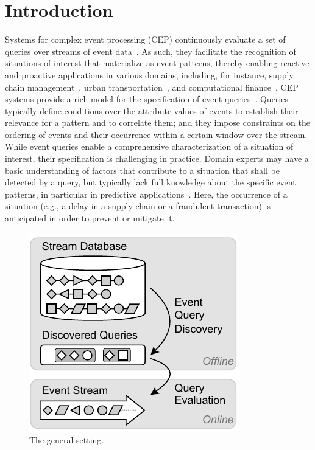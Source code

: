\section{Introduction}
\label{sec:introduction}
Systems for complex event processing (CEP) continuously evaluate a set of
queries over streams of event
data~\cite{DBLP:journals/csur/CugolaM12,DBLP:journals/vldb/GiatrakosAADG20}. As
such, they facilitate the recognition of situations of interest that
materialize as event patterns, thereby enabling reactive and proactive
applications in various domains, including, for instance,
supply chain management~\cite{DBLP:journals/cii/KonovalenkoL19}, urban
transportation~\cite{DBLP:conf/edbt/ArtikisWSBLPBMKMGMGK14}, and
computational finance~\cite{DBLP:journals/computer/ChandramouliAGSR10}.
CEP systems provide a rich model for the
specification of
event queries~\cite{DBLP:conf/debs/ArtikisMUVW17}. Queries typically define
conditions over the attribute values of events to establish their relevance
for a pattern and to correlate them; and they impose constraints on the
ordering of events and their occurrence within a certain window over the
stream.
While event queries enable a comprehensive characterization of a situation of
interest, their specification is challenging in practice. Domain experts may
have a basic understanding of factors that contribute to a
situation that shall be detected by a query, but typically lack full knowledge
about the specific event patterns, in particular in predictive
applications~\cite{DBLP:conf/debs/EngelEF12,DBLP:conf/debs/SejdovicHRS16}.
Here, the occurrence of a
situation (e.g., a delay in a supply chain or a
fraudulent
transaction) is anticipated in order to prevent or mitigate it.
\begin{figure}
	\centering
	\vspace{-1em}
	\includegraphics[width=0.5\columnwidth]{img/overview.drawio.pdf}
	\vspace{-2.0em}
	\caption{The general setting.}
	\label{fig:overview}
	\vspace{-1em}
\end{figure}
